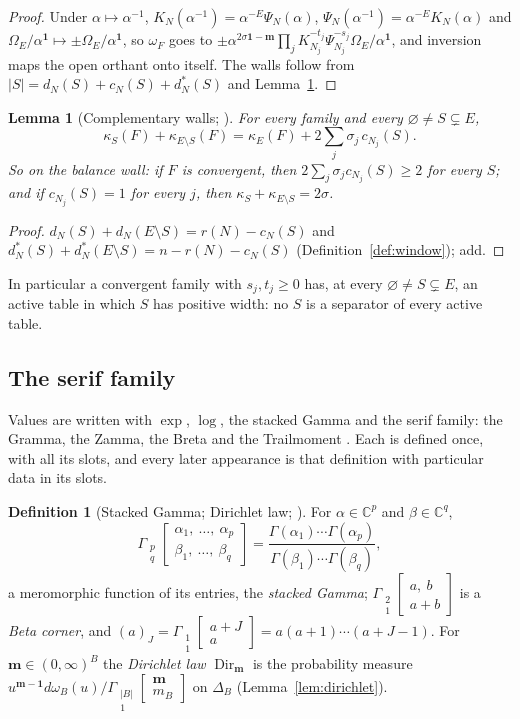 \documentclass[11pt]{article}
\theoremstyle{plain}
\newtheorem{lemma}[prop]{Lemma}
\theoremstyle{definition}
\newtheorem{defn}[prop]{Definition}
\theoremstyle{remark}
\newcommand{\bm}{\mathbf m}
\newcommand{\Gst}[4]{\Gamma_{\substack{#1\\#2}}\!\begin{bmatrix}#3\\#4\end{bmatrix}}
\DeclareMathOperator{\Dir}{Dir}
\begin{document}
\begin{proof}
Under $\alpha\mapsto\alpha^{-1}$, $K_{N}(\alpha^{-1})=\alpha^{-E}\Psi_N(\alpha)$, $\Psi_N(\alpha^{-1})=\alpha^{-E}K_N(\alpha)$ and $\Omega_E/\alpha^{\mathbf 1}\mapsto\pm\Omega_E/\alpha^{\mathbf 1}$, so $\omega_F$ goes to $\pm\alpha^{2\sigma\mathbf 1-\bm}\prod_jK_{N_j}^{-t_j}\Psi_{N_j}^{-s_j}\Omega_E/\alpha^{\mathbf 1}$, and inversion maps the open orthant onto itself. The walls follow from $|S|=d_N(S)+c_N(S)+d^\ast_N(S)$ and Lemma~\ref{lem:compwalls}.
\end{proof}

\begin{lemma}[Complementary walls; {\cite[Prop.~8.15, p.~57]{F}}]\label{lem:compwalls}
For every family and every $\varnothing\neq S\subsetneq E$,
\[
\kappa_S(F)+\kappa_{E\setminus S}(F)=\kappa_E(F)+2\sum_j\sigma_j\,c_{N_j}(S).
\]
So on the balance wall: if $F$ is convergent, then $2\sum_j\sigma_jc_{N_j}(S)\ge2$ for every $S$; and if $c_{N_j}(S)=1$ for every $j$, then $\kappa_S+\kappa_{E\setminus S}=2\sigma$.
\end{lemma}

\begin{proof}
$d_N(S)+d_N(E\setminus S)=r(N)-c_N(S)$ and $d^\ast_N(S)+d^\ast_N(E\setminus S)=n-r(N)-c_N(S)$ (Definition~\ref{def:window}); add.
\end{proof}

In particular a convergent family with $s_j,t_j\ge0$ has, at every $\varnothing\neq S\subsetneq E$, an active table in which $S$ has positive width: no $S$ is a separator of every active table.

\subsection{The serif family}\label{sec:serif}

Values are written with $\exp$, $\log$, the stacked Gamma and the serif family: the Gramma, the Zamma, the Breta and the Trailmoment \cite[Def.~1.1(vi), p.~10]{F}. Each is defined once, with all its slots, and every later appearance is that definition with particular data in its slots.

\begin{defn}[Stacked Gamma; Dirichlet law; {\cite[Def.~1.2, p.~11; Def.~3.10, p.~21]{F}}]\label{def:stacked}
For $\alpha\in\mathbb C^p$ and $\beta\in\mathbb C^q$,
\[
\Gst pq{\alpha_1,\ \dots,\ \alpha_p}{\beta_1,\ \dots,\ \beta_q}=\frac{\Gamma(\alpha_1)\cdots\Gamma(\alpha_p)}{\Gamma(\beta_1)\cdots\Gamma(\beta_q)},
\]
a meromorphic function of its entries, the \emph{stacked Gamma}; $\Gst21{a,\ b}{a+b}$ is a \emph{Beta corner}, and $(a)_J=\Gst11{a+J}{a}=a(a+1)\cdots(a+J-1)$. For $\bm\in(0,\infty)^B$ the \emph{Dirichlet law} $\Dir_{\bm}$ is the probability measure $u^{\bm-\mathbf 1}d\omega_B(u)\big/\Gst{|B|}1{\bm}{m_B}$ on $\Delta_B$ (Lemma~\ref{lem:dirichlet}).
\end{defn}
\end{document}
